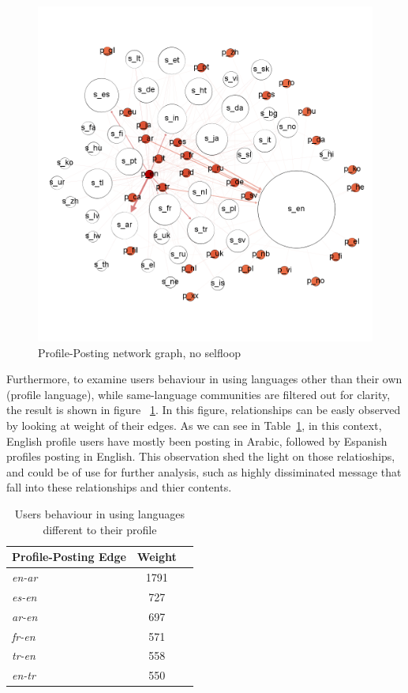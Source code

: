 \begin{figure}[htb]
\centering
\includegraphics[width=\columnwidth]{images/baltimore_p_s_lang_nsl.png}
\caption{Profile-Posting network graph, no selfloop}
\label{fig:baltimore_p_s_lang_nsl}
\end{figure}

Furthermore, to examine users behaviour in using languages other than their own (profile language), while same-language 
communities are filtered out for clarity, the result is shown in figure ~\ref{fig:baltimore_p_s_lang_nsl}. 
In this figure, relationships can be easly observed by looking at weight of their edges. As we can see in Table~\ref{tbl:baltimoredifflang}, in this context,  
English profile users have mostly been posting in Arabic, followed by Espanish profiles posting in English. This observation shed the light on those relatioships, and could be of use for further analysis, such as highly dissiminated message that fall into these relationships and thier contents. 

\begin{table}[!htb]
\centering
\begin{tabular}{@{}lcr@{}}
\toprule
\textbf{Profile-Posting Edge} & \textbf{Weight} \\ \midrule
{\emph{en-ar}} & 1791 \\
{\emph{es-en}} & 727 \\
{\emph{ar-en}} & 697\\ 
{\emph{fr-en}} & 571 \\
{\emph{tr-en}} & 558 \\
{\emph{en-tr}} & 550 \\ \bottomrule
\end{tabular}
\caption{Users behaviour in using languages different to their profile}
\label{tbl:baltimoredifflang}
\end{table}


